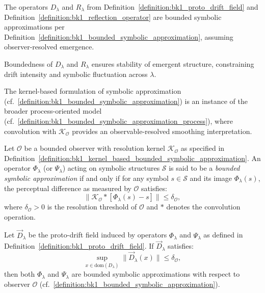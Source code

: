 \begin{proposition}
\label{prop:bk1_the_operators_lambda_and_lambda}
The operators $D_\lambda$ and $R_\lambda$ from Definition~\ref{definition:bk1_proto_drift_field} and Definition~\ref{definition:bk1_reflection_operator} are bounded symbolic approximations per Definition~\ref{definition:bk1_bounded_symbolic_approximation}, assuming observer-resolved emergence.
\end{proposition}

\begin{scholium}
\label{scholium:bk1_consequences_of_bounded_pre_geometric_operations}
Boundedness of $D_\lambda$ and $R_\lambda$ ensures stability of emergent structure, constraining drift intensity and symbolic fluctuation across $\lambda$.
\end{scholium}

\begin{remark}
The kernel-based formulation of symbolic approximation (cf.~\ref{definition:bk1_bounded_symbolic_approximation}) is an instance of the broader process-oriented model (cf.~\ref{definition:bk1_bounded_symbolic_approximation_process}), where convolution with $\mathcal{K}_\mathcal{O}$ provides an observable-resolved smoothing interpretation.
\end{remark}

\begin{definition}
\label{definition:bk1_bounded_symbolic_approximation}
Let $\mathcal{O}$ be a bounded observer with resolution kernel $\mathcal{K}_\mathcal{O}$ as specified in Definition~\ref{definition:bk1_kernel_based_bounded_symbolic_approximation}. An operator $\Phi_\lambda$ (or $\Psi_\lambda$) acting on symbolic structures $\mathcal{S}$ is said to be a \emph{bounded symbolic approximation} if and only if for any symbol $s \in \mathcal{S}$ and its image $\Phi_\lambda(s)$, the perceptual difference as measured by $\mathcal{O}$ satisfies:
\begin{equation}
\|\mathcal{K}_\mathcal{O} \ast [\Phi_\lambda(s) - s]\| \leq \delta_\mathcal{O},
\end{equation}
where $\delta_\mathcal{O} > 0$ is the resolution threshold of $\mathcal{O}$ and $\ast$ denotes the convolution operation.
\end{definition}

\begin{proposition}
\label{prop:bk1_boundedness_from_drift}
Let $\vec{D}_\lambda$ be the proto-drift field induced by operators $\Phi_\lambda$ and $\Psi_\lambda$ as defined in Definition~\ref{definition:bk1_proto_drift_field}. If $\vec{D}_\lambda$ satisfies:
\begin{equation}
\sup_{x \in \mathrm{dom}(D_\lambda)} \|\vec{D}_\lambda(x)\| \leq \delta_\mathcal{O},
\end{equation}
then both $\Phi_\lambda$ and $\Psi_\lambda$ are bounded symbolic approximations with respect to observer $\mathcal{O}$ (cf.~\ref{definition:bk1_bounded_symbolic_approximation}).
\end{proposition}

